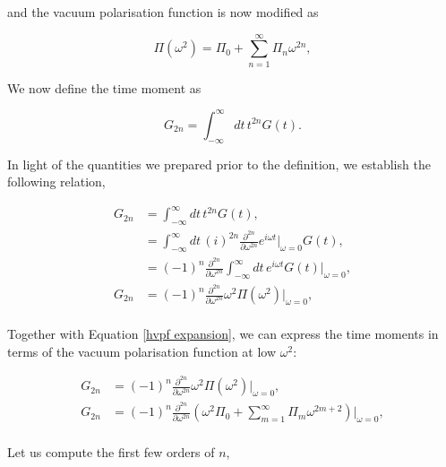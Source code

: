\documentclass{article}
\numberwithin{equation}{section} %
\begin{document}
\noindent and the vacuum polarisation function is now modified as

\begin{equation}
\Pi(\omega^2) = \Pi_0 + \sum_{n=1}^\infty \Pi_n \omega^{2n},
\label{hvpf expansion}
\end{equation}

We now define the time moment as

\begin{equation}
G_{2n} = \int^\infty_{-\infty} dt \, t^{2n} G(t).
\end{equation}

In light of the quantities we prepared prior to the definition, we establish the following relation,

\begin{equation}
\begin{split}
G_{2n} &= \int^\infty_{-\infty} dt \, t^{2n} G(t),\\
&=  \int^\infty_{-\infty} dt \, (i)^{2n} \frac{\partial^{2n}}{\partial \omega^{2n}} e^{i\omega t} \bigg \vert_{\omega=0} G(t),\\
&=  (-1)^{n} \frac{\partial^{2n}}{\partial \omega^{2n}}\int^\infty_{-\infty} dt \,  e^{i\omega t} G(t) \bigg \vert_{\omega=0} ,\\
G_{2n}&=  (-1)^{n} \frac{\partial^{2n}}{\partial \omega^{2n}} \omega^2 \Pi(\omega^2)\bigg \vert_{\omega=0} ,\\
\end{split}
\end{equation}

Together with Equation \ref{hvpf expansion}, we can express the time moments in terms of the vacuum polarisation function at low $\omega^2$:

\begin{equation}
\begin{split}
G_{2n}&=  (-1)^{n} \frac{\partial^{2n}}{\partial \omega^{2n}} \omega^2 \Pi(\omega^2)\bigg \vert_{\omega=0} ,\\
G_{2n}&=  (-1)^{n} \frac{\partial^{2n}}{\partial \omega^{2n}} (\omega^2 \Pi_0 + \sum_{m=1}^\infty \Pi_m \omega^{2m+2})\bigg \vert_{\omega=0} ,\\
\end{split}
\end{equation}

Let us compute the first few orders of $n$,
\end{document}
